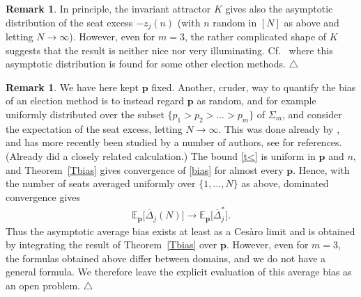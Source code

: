 \documentclass[11pt,reqno,tbtags,a4paper]{amsart}
\numberwithin{equation}{section}
\theoremstyle{plain}%
\theoremstyle{definition}
\newcommand\xqed[1]{%
    \leavevmode\unskip\penalty9999 \hbox{}\nobreak\hfill
    \quad\hbox{#1}}
\newtheorem{remarkqqq}[theorem]{Remark}
\newenvironment{remark}{\begin{remarkqqq}}
  {\xqed{$\triangle$}\end{remarkqqq}}
\theoremstyle{remark}
\newcommand{\refT}[1]{Theorem~\ref{#1}}
\newcommand\set[1]{\ensuremath{\{#1\}}}
\newcommand\Ntoo{\ensuremath{{N\to\infty}}}
\newcommand\E{\operatorname{\mathbb E{}}}
\newcommand\gD{\Delta}
\newcommand\gS{\Sigma}
\newcommand\vp{\mathbf{p}}
\newcommand\bgD{\overline{\gD}}
\newcommand\bgDx{\overline{\gD}^*}
\newcommand\0{{\boldsymbol 0}}
\newcommand\1{{\boldsymbol 1}}
\begin{document}
\begin{remark}
  In principle, the invariant attractor $K$ gives also the asymptotic
  distribution of the seat excess $-z_j(n)$ (with $n$ random in $[N]$ as
  above and letting \Ntoo). However, even for $m=3$, the
  rather complicated shape of $K$ suggests that the result is neither nice
  nor very illuminating. Cf.\ \cite{SJ262} where this asymptotic distribution is
  found for some other election methods.
\end{remark}

\begin{remark}
We have here kept $\vp$ fixed.
  Another, cruder, way to quantify the bias of an election method
is to instead regard $\vp$ as
random, and for example uniformly distributed over 
the subset $\set{p_1>p_2>\dots>p_m}$ of $\gS_m$,
and consider the expectation of the seat excess, letting \Ntoo.
This was  done already  by \citet{Polya1918a,Polya1918b,Polya1919}, and has more
recently
been studied by a number of authors, see \cite{SJ262} for references.
(Already \citet{StL2} did a closely related calculation.)
The bound \eqref{t<} is uniform in $\vp$ and $n$, and \refT{Tbias} gives
convergence of \eqref{bias} for almost every $\vp$.
Hence,
with the number of seats averaged uniformly over $\{1,\dots,N\}$ as
above, dominated convergence gives
\begin{align}
 \E_{\vp}\bigl[\bgD_j(N)\bigr]\longrightarrow
 \E_{\vp}\bigl[\bgDx_j\bigr].
\end{align}
Thus the asymptotic average bias exists at least as a Ces{\`a}ro limit
and is obtained by integrating the result of
\refT{Tbias} over $\vp$.
However, even for $m=3$, the formulas obtained above differ between domains,
and we do not have a general formula. We therefore leave the explicit
evaluation of this average bias as an open problem.
\end{remark}
\end{document}
